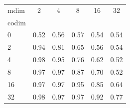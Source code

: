 \begin{tabular}{l|ccccc}
\toprule
mdim & 2 & \textcolor{blue!70!black}{4} & 8 & 16 & 32 \\
codim &  &  &  &  &  \\
\midrule
0 & 0.52 & \textcolor{blue!70!black}{0.56} & 0.57 & 0.54 & 0.54 \\
2 & 0.94 & \textcolor{blue!70!black}{0.81} & 0.65 & 0.56 & 0.54 \\
\textcolor{red!70!black}{4} & \textcolor{red!70!black}{0.98} & \textcolor{purple!70!black}{0.95} & \textcolor{red!70!black}{0.76} & \textcolor{red!70!black}{0.62} & \textcolor{red!70!black}{0.52} \\
8 & 0.97 & \textcolor{blue!70!black}{0.97} & 0.87 & 0.70 & 0.52 \\
16 & 0.97 & \textcolor{blue!70!black}{0.97} & 0.95 & 0.85 & 0.64 \\
32 & 0.98 & \textcolor{blue!70!black}{0.97} & 0.97 & 0.92 & 0.77 \\
\bottomrule
\end{tabular}
